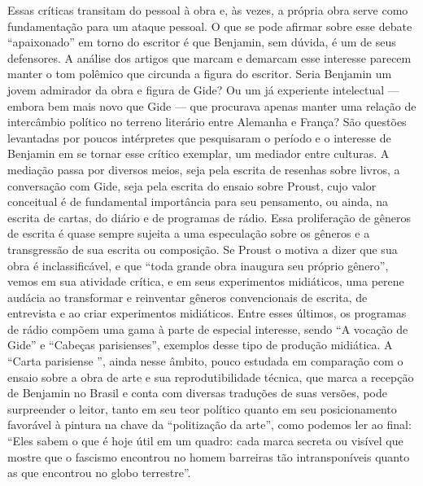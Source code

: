 Essas críticas transitam do pessoal à obra e, às vezes, a própria obra
serve como fundamentação para um ataque pessoal. O que se pode afirmar
sobre esse debate ``apaixonado'' em torno do escritor é que Benjamin,
sem dúvida, é um de seus defensores. A análise dos artigos que marcam e
demarcam esse interesse parecem manter o tom polêmico que circunda a
figura do escritor. Seria Benjamin um jovem admirador da obra e figura
de Gide? Ou um já experiente intelectual --- embora bem mais novo que
Gide --- que procurava apenas manter uma relação de intercâmbio político
no terreno literário entre Alemanha e França? São questões levantadas por poucos
intérpretes que pesquisaram o período e o interesse de Benjamin em se
tornar esse crítico exemplar, um mediador entre culturas. A mediação
passa por diversos meios, seja pela escrita de resenhas sobre livros, a
conversação com Gide, seja pela escrita do ensaio sobre Proust, cujo
valor conceitual é de fundamental importância para seu pensamento, ou
ainda, na escrita de cartas, do diário e de programas de rádio. Essa
proliferação de gêneros de escrita é quase sempre sujeita a uma
especulação sobre os gêneros e a transgressão de sua escrita ou
composição. Se Proust o motiva a dizer que sua obra é inclassificável, e
que ``toda grande obra inaugura seu próprio gênero'', vemos em sua
atividade crítica, e em seus experimentos midiáticos, uma perene audácia
ao transformar e reinventar gêneros convencionais de escrita, de
entrevista e ao criar experimentos midiáticos. Entre esses últimos, os
programas de rádio compõem uma gama à parte de especial interesse, sendo
``A vocação de Gide'' e ``Cabeças parisienses'', exemplos desse tipo de produção midiática. A ``Carta parisiense '', ainda nesse âmbito, pouco estudada em comparação
com o ensaio sobre a obra de arte e sua reprodutibilidade técnica, que
marca a recepção de Benjamin no Brasil e conta com diversas traduções de
suas versões, pode surpreender o leitor, tanto em seu teor político
quanto em seu posicionamento favorável à pintura na chave da
``politização da arte'', como podemos ler ao final: ``Eles sabem o que é hoje útil
em um quadro: cada marca secreta ou visível que mostre que o fascismo
encontrou no homem barreiras tão intransponíveis quanto as que encontrou no globo
terrestre''.

